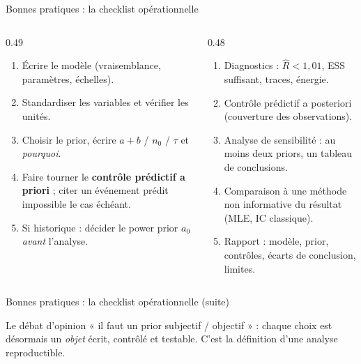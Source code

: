 \begin{frame}{Bonnes pratiques : la checklist opérationnelle}
\begin{columns}[t]
\begin{column}{0.49\textwidth}
\begin{abox}
\begin{enumerate}
  \item Écrire le modèle (vraisemblance, paramètres, échelles).
  \item Standardiser les variables et vérifier les unités.
  \item Choisir le prior, écrire $a+b$ / $n_0$ / $\tau$ et \emph{pourquoi}.
  \item Faire tourner le \textbf{contrôle prédictif a priori} ;
        citer un événement prédit impossible le cas échéant.
  \item Si historique : décider le power prior $a_0$ \emph{avant} l'analyse.
\end{enumerate}
\end{abox}
\end{column}
\begin{column}{0.48\textwidth}
\begin{abox}
\begin{enumerate}
  \item Diagnostics : $\hat R < 1{,}01$, ESS suffisant, traces, énergie.
  \item Contrôle prédictif a posteriori (couverture des observations).
  \item Analyse de sensibilité : au moins deux priors, un tableau de conclusions.
  \item Comparaison à une méthode non informative du résultat (MLE, IC classique).
  \item Rapport : modèle, prior, contrôles, écarts de conclusion, limites.
\end{enumerate}
\end{abox}
\end{column}
\end{columns}
\vspace{1mm}
\end{frame}

\begin{frame}{Bonnes pratiques : la checklist opérationnelle (suite)}
\begin{ebox}
Le débat d'opinion « il faut un prior subjectif / objectif » : chaque choix est
désormais un \emph{objet} écrit, contrôlé et testable. C'est la définition d'une
analyse reproductible.
\end{ebox}
\end{frame}


